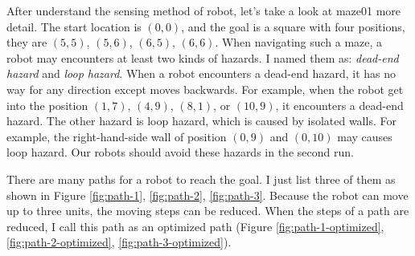 \documentclass[11pt, oneside]{article}   	%
\begin{document}
After understand the sensing method of robot, let's take a look at maze01 more detail. The start location is $(0,0)$, and the goal is a square with four positions, they are $(5,5)$, $(5,6)$, $(6,5)$, $(6,6)$. When navigating such a maze, a robot may encounters at least two kinds of hazards. I named them as: {\it dead-end hazard} and {\it loop hazard}. When a robot encounters a dead-end hazard, it has no way for any direction except moves backwards. For example, when the robot get into the position $(1,7)$, $(4,9)$, $(8,1)$, or $(10,9)$, it encounters a dead-end hazard. The other hazard is loop hazard, which is caused by isolated walls. For example, the right-hand-side wall of position $(0,9)$ and $(0,10)$ may causes loop hazard. Our robots should avoid these hazards in the second run.

There are many paths for a robot to reach the goal. I just list three of them as shown in Figure \ref{fig:path-1}, \ref{fig:path-2}, \ref{fig:path-3}. Because the robot can move up to three units, the moving steps can be reduced. When the steps of a path are reduced, I call this path as an optimized path (Figure \ref{fig:path-1-optimized}, \ref{fig:path-2-optimized}, \ref{fig:path-3-optimized}).
\end{document}

